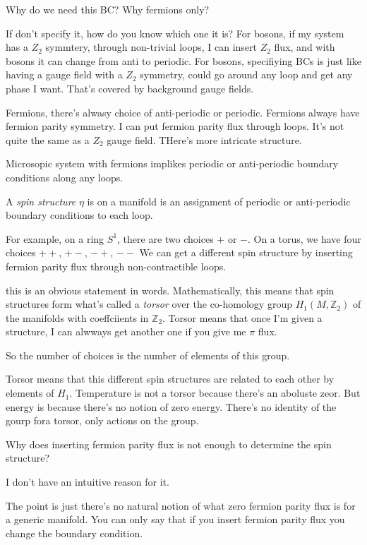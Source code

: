  \begin{question}
     Why do we need this BC?
     Why fermions only?
 \end{question}
 If don't specify it,
 how do you know which one it is?
 For bosons,
 if my system has a $Z_2$ symmtery,
 through non-trivial loops,
 I can insert $Z_2$ flux,
 and with bosons it can change from anti to periodic.
 For bosons,
 specifiying BCs is just like having a gauge field with a $Z_2$ symmetry,
 could go around any loop and get any phase I want.
 That's covered by background gauge fields.

 Fermions,
 there's alwasy choice of anti-periodic or periodic.
 Fermions always have fermion parity symmetry.
 I can put fermion parity flux through loops.
 It's not quite the same as a $Z_2$ gauge field.
 THere's more intricate structure.

 Microsopic system with fermions implikes periodic or anti-periodic boundary
 conditions along any loops.

 A \emph{spin structure} $\eta$ is on a manifold is an assignment of
 periodic or anti-periodic boundary conditions to each loop.

 For example, on a ring $S^1$,
 there are two choices $+$ or $-$.
 On a torus,
 we have four choices $++$, $+-$, $-+$, $--$
 We can get a different spin structure
 by inserting fermion parity flux through non-contractible loops.

 this is an obvious statement in words.
 Mathematically, this means that spin structures form what's called a
 \emph{torsor} over the co-homology group $H_1(M,\mathbb{Z}_2)$ of the manifolds
 with coeffciients in $\mathbb{Z}_2$.
 Torsor means that once I'm given a structure,
 I can alwways get another one if you give me $\pi$ flux.

 So the number of choices is the number of elements of this group.

 Torsor means that this different spin structures are related to each other by
 elements of $H_1$.
 Temperature is not a torsor because there's an aboluste zeor.
 But energy is because there's no notion of zero energy.
 There's no identity of the gourp fora torsor,
 only actions on the group.

 \begin{question}
     Why does inserting fermion parity flux is not enough to determine the spin
     structure?
 \end{question}
 I don't have an intuitive reason for it.

 The point is just there's no natural notion of what zero fermion parity flux is
 for a generic manifold.
 You can only say that if you insert fermion parity flux you change the boundary
 condition.

